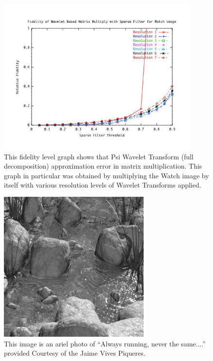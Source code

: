 \begin{figure}
\includegraphics [width=4in]{watchResultsB.jpg}
\caption{This fidelity level graph shows that Psi Wavelet Transform (full decomposition) approximation error in matrix multiplication.  This graph in particular was obtained by multiplying the Watch image by itself with various resolution levels of Wavelet Transforms applied.  \cite{watch}  }
\label{image_watch_fidelity}
\end{figure}

\begin{figure}
\includegraphics [width=3in]{water.jpg}
\caption{This image is an ariel photo of  ``Always running, never the same....'' provided Courtesy of the Jaime Vives Piqueres.  \cite{water}}
\label{image Peppers}
\end{figure}

